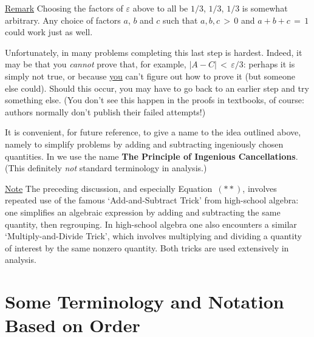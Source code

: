         \underline{Remark} Choosing the factors of ${\varepsilon}$ above to all be $1/3$, $1/3$, $1/3$ is somewhat arbitrary.
    Any choice of factors $a$, $b$ and $c$ such that $a, b, c\,>\,0$ and $a+b+c \,=\, 1$ could work just as well.

\V

\noindent Unfortunately, in many problems completing this last step is hardest. Indeed, it may be that you {\em cannot} prove that, for example, $|A-C|\,<\,{\varepsilon}/3$:
    perhaps it is simply not true, or because \underline{you} can't figure out how to prove it (but someone else could).
    Should this occur, you may have to go back to an earlier step and try something else.
    (You don't see this happen in the proofs in textbooks, of course: authors normally don't publish their failed attempts!)

\V

        It is convenient, for future reference, to give a name to the idea outlined above,
    namely to simplify problems by adding and subtracting ingeniously chosen quantities.
    In {\TheseNotes} we use the name {\bf The Principle of Ingenious Cancellations}.
    (This definitely {\em not} standard terminology in analysis.)

\VV

        \underline{Note} The preceding discussion, and especially Equation~$({\ast}{\ast})$,
    involves repeated use of the famous `Add-and-Subtract Trick' from high-school algebra:
    one simplifies an algebraic expression by adding and subtracting the same  quantity, then regrouping.
    In high-school algebra one also encounters a similar `Multiply-and-Divide Trick',
    which involves multiplying and dividing a quantity of interest by the same nonzero quantity.
    Both tricks are used extensively in analysis.
    

\V
\V


\V
\V

                        \section{{\bf Some Terminology and Notation Based on Order}}
                        \label{SectB25}
        
